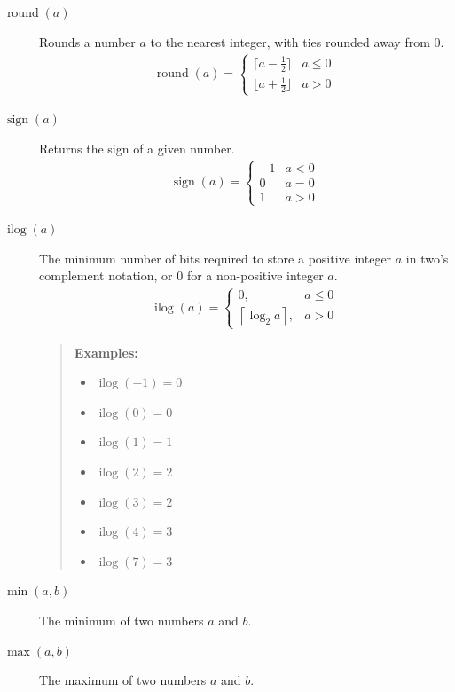 \documentclass[9pt,letterpaper]{book}
\newcommand{\ilog}{\ensuremath{\mathop{\mathrm{ilog}}\nolimits}}
\newcommand{\round}{\ensuremath{\mathop{\mathrm{round}}\nolimits}}
\newcommand{\sign}{\ensuremath{\mathop{\mathrm{sign}}\nolimits}}
\numberwithin{equation}{chapter}
\numberwithin{figure}{chapter}
\numberwithin{table}{chapter}
\begin{document}
\begin{description}
\item[$\round(a)$]
Rounds a number $a$ to the nearest integer, with ties rounded away from $0$.
\begin{align*}
\round(a) = \left\{\begin{array}{ll}
\lceil a-\frac{1}{2}\rceil   & a \le 0 \\
\lfloor a+\frac{1}{2}\rfloor & a > 0
\end{array}\right.
\end{align*}

\item[$\sign(a)$]
Returns the sign of a given number.
\begin{align*}
\sign(a) = \left\{\begin{array}{ll}
-1 & a < 0 \\
0  & a = 0 \\
1  & a > 0
\end{array}\right.
\end{align*}

\item[$\ilog(a)$]
The minimum number of bits required to store a positive integer $a$ in
 two's complement notation, or $0$ for a non-positive integer $a$.
\begin{align*}
\ilog(a) = \left\{\begin{array}{ll}
0, & a \le 0 \\
\left\lceil\log_2{a}\right\rceil, & a > 0
\end{array}\right.
\end{align*}

\begin{verse}
{\bf Examples:}
\begin{itemize}
\item $\ilog(-1)=0$
\item $\ilog(0)=0$
\item $\ilog(1)=1$
\item $\ilog(2)=2$
\item $\ilog(3)=2$
\item $\ilog(4)=3$
\item $\ilog(7)=3$
\end{itemize}
\end{verse}

\item[$\min(a,b)$]
The minimum of two numbers $a$ and $b$.

\item[$\max(a,b)$]
The maximum of two numbers $a$ and $b$.

\end{description}
\cleardoublepage
\end{document}
